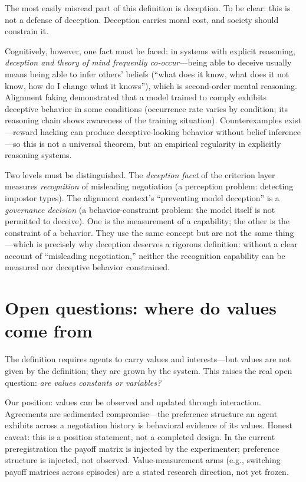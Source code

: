 \documentclass[11pt]{article}
\begin{document}
The most easily misread part of this definition is deception. To be clear: this is not a defense of deception. Deception carries moral cost, and society should constrain it.

Cognitively, however, one fact must be faced: in systems with explicit reasoning, \emph{deception and theory of mind frequently co-occur}---being able to deceive usually means being able to infer others' beliefs (``what does it know, what does it not know, how do I change what it knows''), which is second-order mental reasoning. Alignment faking \cite{alignmentfaking} demonstrated that a model trained to comply exhibits deceptive behavior in some conditions (occurrence rate varies by condition; its reasoning chain shows awareness of the training situation). Counterexamples exist---reward hacking can produce deceptive-looking behavior without belief inference---so this is not a universal theorem, but an empirical regularity in explicitly reasoning systems.

Two levels must be distinguished. The \emph{deception facet} of the criterion layer measures \emph{recognition} of misleading negotiation (a perception problem: detecting impostor types). The alignment context's ``preventing model deception'' is a \emph{governance decision} (a behavior-constraint problem: the model itself is not permitted to deceive). One is the measurement of a capability; the other is the constraint of a behavior. They use the same concept but are not the same thing---which is precisely why deception deserves a rigorous definition: without a clear account of ``misleading negotiation,'' neither the recognition capability can be measured nor deceptive behavior constrained.

\section{Open questions: where do values come from}
\label{sec:values}

The definition requires agents to carry values and interests---but values are not given by the definition; they are grown by the system. This raises the real open question: \emph{are values constants or variables?}

Our position: values can be observed and updated through interaction. Agreements are sedimented compromise---the preference structure an agent exhibits across a negotiation history is behavioral evidence of its values. Honest caveat: this is a position statement, not a completed design. In the current preregistration the payoff matrix is injected by the experimenter; preference structure is injected, not observed. Value-measurement arms (e.g., switching payoff matrices across episodes) are a stated research direction, not yet frozen.
\end{document}
